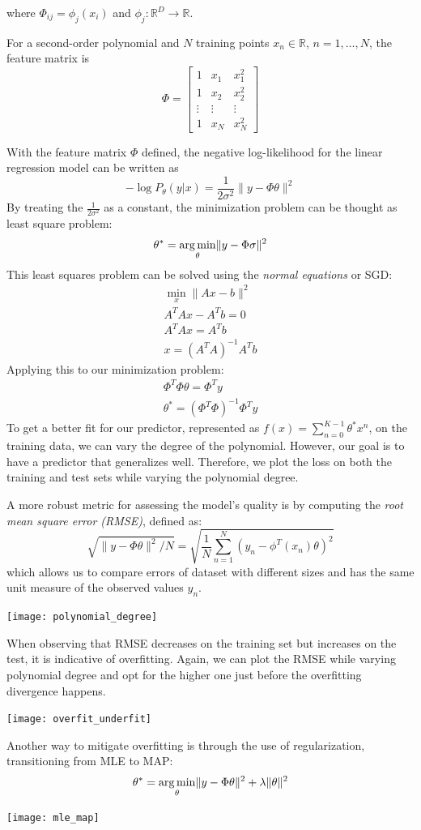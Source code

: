 \documentclass{article}
\begin{document}
where $\Phi_{ij}=\phi_j(x_i)$ and $\phi_j:\mathbb{R}^D\to \mathbb{R}$.
\begin{example}
    For a second-order polynomial and $N$ training points $x_n\in \mathbb{R}$,
    $n=1,\ldots,N$, the feature matrix is
    $$
    \Phi=\begin{bmatrix}
        1 & x_1 & x_1^2 \\ 
        1 & x_2 & x_2^2 \\ 
        \vdots & \vdots & \vdots \\ 
        1 & x_N & x_N^2
    \end{bmatrix}
    $$
\end{example}
With the feature matrix $\Phi$ defined, the negative log-likelihood for the
linear regression model can be written as 
$$-\log P_\theta(y|x)=\frac{1}{2\sigma^2}\lVert y-\Phi\theta\rVert^2$$
By treating the $\frac{1}{2\sigma^2}$ as a constant, the minimization problem
can be thought as least square problem:
$$\theta^*=\operatorname*{arg\,min}_{\theta}\lVert y-\Phi\sigma\rVert^2$$
This least squares problem can be solved using the \textit{normal equations} or SGD:
$$
\begin{aligned}
    \min_x\lVert Ax-b\rVert^2 \\
    A^TAx-A^Tb=0 \\
    A^TAx=A^Tb \\ 
    x=(A^TA)^{-1}A^Tb
\end{aligned}
$$
Applying this to our minimization problem:
$$
\begin{aligned}
    \Phi^T\Phi\theta=\Phi^Ty\\
    \theta^*=(\Phi^T\Phi)^{-1}\Phi^Ty
\end{aligned}
$$
To get a better fit for our predictor, represented as
$f(x)=\sum_{n=0}^{K-1}\theta^*x^n$, on the training data, we can vary the
degree of the polynomial. However, our goal is to have a predictor that
generalizes well. Therefore, we plot the loss on both the training and
test sets while varying the polynomial degree.

A more robust metric for assessing the model's quality is by computing the
\textit{root mean square error (RMSE)}, defined as:
$$\sqrt{\lVert
y-\Phi\theta\rVert^2/N}=\sqrt{\frac{1}{N}\sum_{n=1}^{N}(y_n-\phi^T(x_n)\theta)^2}$$
which allows us to compare errors of dataset with different sizes and has the
same unit measure of the observed values $y_n$.
\begin{center}
    \texttt{[image: polynomial\_degree]}
\end{center}
When observing that RMSE decreases on the training set but increases on the
test, it is indicative of overfitting. Again, we can plot the RMSE while
varying polynomial degree and opt for the higher one just before the
overfitting divergence happens.
\begin{center}
    \texttt{[image: overfit\_underfit]}
\end{center}
Another way to mitigate overfitting is through the use of regularization,
transitioning from MLE to MAP:
$$\theta^*=\operatorname*{arg\,min}_\theta \lVert y-\Phi\theta\rVert^2+\lambda \lVert
\theta\rVert^2$$
\begin{center}
    \texttt{[image: mle\_map]}
\end{center}
\end{document}
